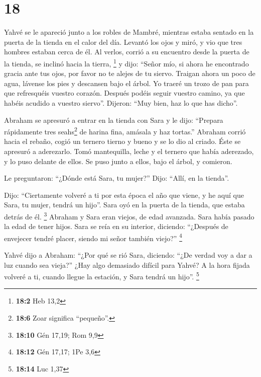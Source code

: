 \hypertarget{section-17}{%
\section{18}\label{section-17}}

 Yahvé se le apareció junto a los robles de Mambré,
mientras estaba sentado en la puerta de la tienda en el calor del día.
 Levantó los ojos y miró, y vio que tres hombres estaban
cerca de él. Al verlos, corrió a su encuentro desde la puerta de la
tienda, se inclinó hacia la tierra, \footnote{\textbf{18:2} Heb 13,2}
 y dijo: ``Señor mío, si ahora he encontrado gracia ante
tus ojos, por favor no te alejes de tu siervo.  Traigan
ahora un poco de agua, lávense los pies y descansen bajo el árbol.
 Yo traeré un trozo de pan para que refresquéis vuestro
corazón. Después podéis seguir vuestro camino, ya que habéis acudido a
vuestro siervo''. Dijeron: ``Muy bien, haz lo que has dicho''.

 Abraham se apresuró a entrar en la tienda con Sara y le
dijo: ``Prepara rápidamente tres seahs\footnote{\textbf{18:6} Zoar
  significa ``pequeño''.} de harina fina, amásala y haz tortas.''
 Abraham corrió hacia el rebaño, cogió un ternero tierno y
bueno y se lo dio al criado. Éste se apresuró a aderezarlo.
 Tomó mantequilla, leche y el ternero que había aderezado,
y lo puso delante de ellos. Se puso junto a ellos, bajo el árbol, y
comieron.

 Le preguntaron: ``¿Dónde está Sara, tu mujer?'' Dijo:
``Allí, en la tienda''.

 Dijo: ``Ciertamente volveré a ti por esta época el año
que viene, y he aquí que Sara, tu mujer, tendrá un hijo''. Sara oyó en
la puerta de la tienda, que estaba detrás de él. \footnote{\textbf{18:10}
  Gén 17,19; Rom 9,9}  Abraham y Sara eran viejos, de
edad avanzada. Sara había pasado la edad de tener hijos. 
Sara se reía en su interior, diciendo: ``¿Después de envejecer tendré
placer, siendo mi señor también viejo?'' \footnote{\textbf{18:12} Gén
  17,17; 1Pe 3,6}

 Yahvé dijo a Abraham: ``¿Por qué se rió Sara, diciendo:
``¿De verdad voy a dar a luz cuando sea vieja?''  ¿Hay
algo demasiado difícil para Yahvé? A la hora fijada volveré a ti, cuando
llegue la estación, y Sara tendrá un hijo''. \footnote{\textbf{18:14}
  Luc 1,37}

